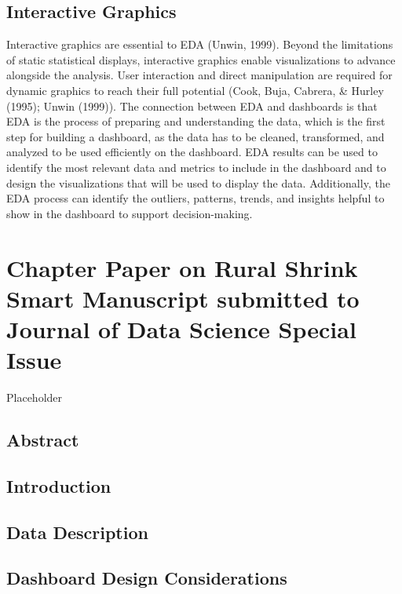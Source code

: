 \documentclass[print]{nuthesis}
\begin{document}
\hypertarget{interactive-graphics}{%
\section{Interactive Graphics}\label{interactive-graphics}}

Interactive graphics are essential to EDA (Unwin, 1999).
Beyond the limitations of static statistical displays, interactive graphics enable visualizations to advance alongside the analysis.
User interaction and direct manipulation are required for dynamic graphics to reach their full potential (Cook, Buja, Cabrera, \& Hurley (1995); Unwin (1999)).
The connection between EDA and dashboards is that EDA is the process of preparing and understanding the data, which is the first step for building a dashboard, as the data has to be cleaned, transformed, and analyzed to be used efficiently on the dashboard.
EDA results can be used to identify the most relevant data and metrics to include in the dashboard and to design the visualizations that will be used to display the data.
Additionally, the EDA process can identify the outliers, patterns, trends, and insights helpful to show in the dashboard to support decision-making.

\hypertarget{rmd-basics}{%
\chapter{Chapter Paper on Rural Shrink Smart Manuscript submitted to Journal of Data Science Special Issue}\label{rmd-basics}}

Placeholder

\hypertarget{abstract}{%
\section{Abstract}\label{abstract}}

\hypertarget{introduction-1}{%
\section{Introduction}\label{introduction-1}}

\hypertarget{data-description}{%
\section{Data Description}\label{data-description}}

\hypertarget{dashboard-design-considerations}{%
\section{Dashboard Design Considerations}\label{dashboard-design-considerations}}
\end{document}
